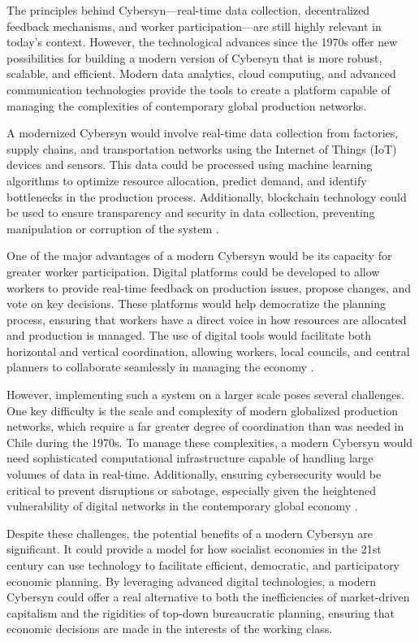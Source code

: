 \begin{refsection}
The principles behind Cybersyn—real-time data collection, decentralized feedback mechanisms, and worker participation—are still highly relevant in today’s context. However, the technological advances since the 1970s offer new possibilities for building a modern version of Cybersyn that is more robust, scalable, and efficient. Modern data analytics, cloud computing, and advanced communication technologies provide the tools to create a platform capable of managing the complexities of contemporary global production networks.

A modernized Cybersyn would involve real-time data collection from factories, supply chains, and transportation networks using the Internet of Things (IoT) devices and sensors. This data could be processed using machine learning algorithms to optimize resource allocation, predict demand, and identify bottlenecks in the production process. Additionally, blockchain technology could be used to ensure transparency and security in data collection, preventing manipulation or corruption of the system \cite[pp.~93]{easterling2016extrastatecraft}.

One of the major advantages of a modern Cybersyn would be its capacity for greater worker participation. Digital platforms could be developed to allow workers to provide real-time feedback on production issues, propose changes, and vote on key decisions. These platforms would help democratize the planning process, ensuring that workers have a direct voice in how resources are allocated and production is managed. The use of digital tools would facilitate both horizontal and vertical coordination, allowing workers, local councils, and central planners to collaborate seamlessly in managing the economy \cite[pp.~63]{lenin1947state}.

However, implementing such a system on a larger scale poses several challenges. One key difficulty is the scale and complexity of modern globalized production networks, which require a far greater degree of coordination than was needed in Chile during the 1970s. To manage these complexities, a modern Cybersyn would need sophisticated computational infrastructure capable of handling large volumes of data in real-time. Additionally, ensuring cybersecurity would be critical to prevent disruptions or sabotage, especially given the heightened vulnerability of digital networks in the contemporary global economy \cite[pp.~15]{medina2014cybersyn}.

Despite these challenges, the potential benefits of a modern Cybersyn are significant. It could provide a model for how socialist economies in the 21st century can use technology to facilitate efficient, democratic, and participatory economic planning. By leveraging advanced digital technologies, a modern Cybersyn could offer a real alternative to both the inefficiencies of market-driven capitalism and the rigidities of top-down bureaucratic planning, ensuring that economic decisions are made in the interests of the working class.


\end{refsection}
